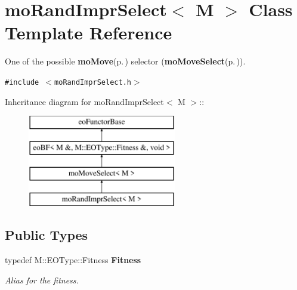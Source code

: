 \section{mo\-Rand\-Impr\-Select$<$ M $>$ Class Template Reference}
\label{classmo_rand_impr_select}
One of the possible {\bf mo\-Move}{\rm (p.\,\pageref{classmo_move})} selector ({\bf mo\-Move\-Select}{\rm (p.\,\pageref{classmo_move_select})}).  


{\tt \#include $<$mo\-Rand\-Impr\-Select.h$>$}

Inheritance diagram for mo\-Rand\-Impr\-Select$<$ M $>$::\begin{figure}[H]
\begin{center}
\leavevmode
\includegraphics[height=4cm]{classmo_rand_impr_select}
\end{center}
\end{figure}
\subsection*{Public Types}
\begin{CompactItemize}
\item 
typedef M::EOType::Fitness {\bf Fitness}\label{classmo_rand_impr_select_w0}

\begin{CompactList}\small\item\em Alias for the fitness. \item\end{CompactList}\end{CompactItemize}
